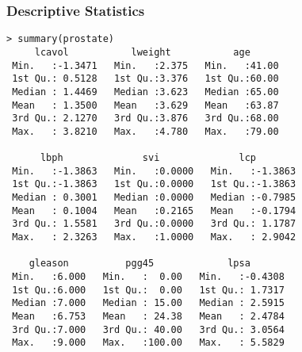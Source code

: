 \frametitle{Descriptive Statistics}
\begin{lstlisting}
> summary(prostate)
     lcavol           lweight           age
 Min.   :-1.3471   Min.   :2.375   Min.   :41.00
 1st Qu.: 0.5128   1st Qu.:3.376   1st Qu.:60.00
 Median : 1.4469   Median :3.623   Median :65.00
 Mean   : 1.3500   Mean   :3.629   Mean   :63.87
 3rd Qu.: 2.1270   3rd Qu.:3.876   3rd Qu.:68.00
 Max.   : 3.8210   Max.   :4.780   Max.   :79.00

      lbph              svi              lcp
 Min.   :-1.3863   Min.   :0.0000   Min.   :-1.3863
 1st Qu.:-1.3863   1st Qu.:0.0000   1st Qu.:-1.3863
 Median : 0.3001   Median :0.0000   Median :-0.7985
 Mean   : 0.1004   Mean   :0.2165   Mean   :-0.1794
 3rd Qu.: 1.5581   3rd Qu.:0.0000   3rd Qu.: 1.1787
 Max.   : 2.3263   Max.   :1.0000   Max.   : 2.9042

    gleason          pgg45             lpsa
 Min.   :6.000   Min.   :  0.00   Min.   :-0.4308
 1st Qu.:6.000   1st Qu.:  0.00   1st Qu.: 1.7317
 Median :7.000   Median : 15.00   Median : 2.5915
 Mean   :6.753   Mean   : 24.38   Mean   : 2.4784
 3rd Qu.:7.000   3rd Qu.: 40.00   3rd Qu.: 3.0564
 Max.   :9.000   Max.   :100.00   Max.   : 5.5829
\end{lstlisting}
